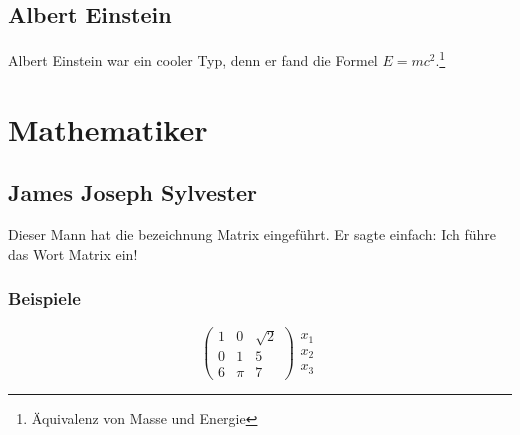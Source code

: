 \documentclass[12pt]{article}
\begin{document}
		\subsection{Albert Einstein}
			Albert Einstein war ein cooler Typ, denn er fand die Formel $E = mc^2$.\footnote{\label{footnote:energy-and-mass} Äquivalenz von Masse und Energie}
	
	\section{Mathematiker}

		\subsection{James Joseph Sylvester}
			Dieser Mann hat die bezeichnung \glqq{}Matrix\grqq{} eingeführt.
			Er sagte einfach: \glqq{}Ich führe das Wort \glq{}Matrix\grq{} ein!\grqq{}
			\subsubsection{Beispiele}
				\begin{equation}
					\left(
					\begin{matrix}
						1 & 0 & \sqrt{2} \\
						0 & 1 & 5 \\
						6 & \pi & 7
					\end{matrix}
					\right)
					\begin{matrix}
						x_1 \\
						x_2 \\
						x_3
					\end{matrix}
				\end{equation}
	
	\newpage
	\begin{appendix}
		 
		
		\listoffigures
		\listoftables
	\end{appendix}

				
\end{document}
